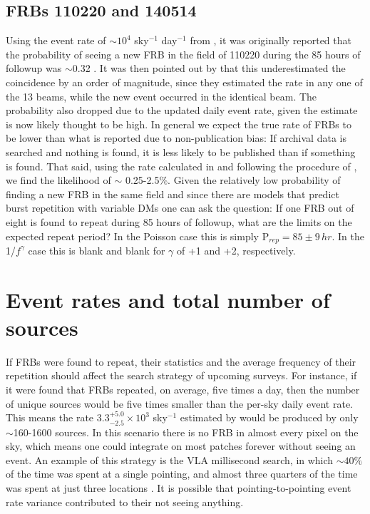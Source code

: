 \documentclass[useAMS,usenatbib]{mn2e}
\begin{document}
\subsection{FRBs 110220 and 140514}
Using the event rate of $\sim10^4$ sky$^{-1}$ day$^{-1}$
from \cite{2013Sci...341...53T}, it 
was originally reported that the probability of seeing a 
new FRB in the field of 110220 during the 85 hours of followup 
was $\sim$0.32  
\citep{2015MNRAS.447..246P}. It was then pointed out by \cite{2015arXiv150701002M} 
that this underestimated the coincidence by an order of magnitude, 
since they estimated the rate in any one of the 13 beams, 
while the new event occurred in the identical beam.
The probability also dropped due to the updated daily event rate,
given the \cite{2013Sci...341...53T} estimate is now likely thought to be high.
In general we expect the true rate of FRBs to be lower than what is 
reported due to non-publication bias: If archival data is searched and 
nothing is found, it is less likely to be published than if something is found. 
That said, using the rate calculated in \cite{2015arXiv150500834R} and following
the procedure of \cite{2015arXiv150701002M}, we find the likelihood of 
$\sim$ 0.25-2.5$\%$. Given the relatively low probability of finding 
a new FRB in the same field and since there are models that predict
burst repetition with variable DMs \citep{2015arXiv150505535C, 2015arXiv150701002M}
one can ask the question: If one FRB out of eight is found to
repeat during 85 hours of followup, what are the limits on the expected
repeat period? In the Poisson case this is simply P$_{rep}=85\pm9 \, hr$. In 
the 1/$f^\gamma$ case this is blank and blank for $\gamma$ of +1 and +2, 
respectively.



\section{Event rates and total number of sources}
\label{rate}

If FRBs were found to repeat, their statistics and the
average frequency of their repetition 
should affect the search strategy of upcoming surveys. 
For instance, if it were found that FRBs repeated,
on average, five times a day, then the number of unique 
sources would be five times smaller than the per-sky 
daily event rate. This means the rate 
$3.3^{+5.0}_{-2.5}\times10^3$ sky$^{-1}$ estimated by 
\cite{2015arXiv150500834R} would be produced by
only $\sim$160-1600 sources. In this scenario 
there is no FRB in almost every pixel on the sky, which means
one could integrate on most patches forever without 
seeing an event. An example of this strategy is the VLA millisecond search, 
in which $\sim40\%$ of the time was spent at a single pointing, and
almost three quarters of the time was spent at just three locations \citep{2015ApJ...807...16L}.
It is possible that pointing-to-pointing event rate variance contributed 
to their not seeing anything.
\end{document}
